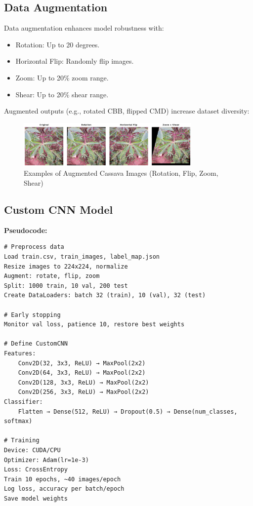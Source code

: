 \documentclass[a4paper,12pt]{article}
\begin{document}
\subsection*{Data Augmentation}
Data augmentation enhances model robustness with:
\begin{itemize}
    \item Rotation: Up to 20 degrees.
    \item Horizontal Flip: Randomly flip images.
    \item Zoom: Up to 20\% zoom range.
    \item Shear: Up to 20\% shear range.
\end{itemize}
Augmented outputs (e.g., rotated CBB, flipped CMD) increase dataset diversity:

\begin{figure}[H]
    \centering
    \includegraphics[width=0.8\textwidth]{assets/cassava/data_aug.png}
    \caption{Examples of Augmented Cassava Images (Rotation, Flip, Zoom, Shear)}
\end{figure}

\subsection*{Custom CNN Model}
\textbf{Pseudocode:}
\begin{verbatim}
# Preprocess data
Load train.csv, train_images, label_map.json
Resize images to 224x224, normalize
Augment: rotate, flip, zoom
Split: 1000 train, 10 val, 200 test
Create DataLoaders: batch 32 (train), 10 (val), 32 (test)

# Early stopping
Monitor val loss, patience 10, restore best weights

# Define CustomCNN
Features:
    Conv2D(32, 3x3, ReLU) → MaxPool(2x2)
    Conv2D(64, 3x3, ReLU) → MaxPool(2x2)
    Conv2D(128, 3x3, ReLU) → MaxPool(2x2)
    Conv2D(256, 3x3, ReLU) → MaxPool(2x2)
Classifier:
    Flatten → Dense(512, ReLU) → Dropout(0.5) → Dense(num_classes, softmax)

# Training
Device: CUDA/CPU
Optimizer: Adam(lr=1e-3)
Loss: CrossEntropy
Train 10 epochs, ~40 images/epoch
Log loss, accuracy per batch/epoch
Save model weights
\end{verbatim}
\end{document}
